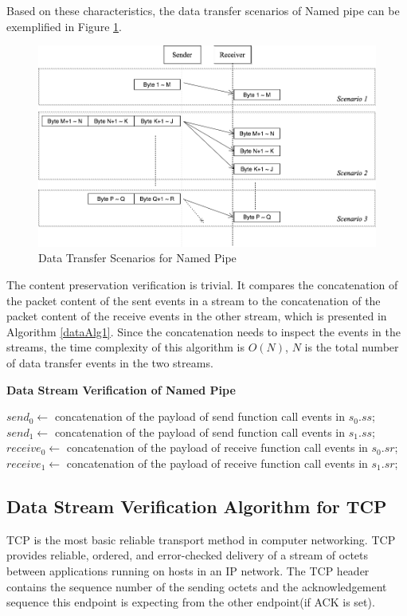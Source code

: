 Based on these characteristics, the data transfer scenarios of Named pipe can be exemplified in Figure \ref{namedpipe}. 
\begin{figure}[H]
\centerline{\includegraphics[scale=0.4]{Figures/namedpipe}}
\caption{Data Transfer Scenarios for Named Pipe}
\label{namedpipe}
\end{figure}

The content preservation verification is trivial. It compares the concatenation of the packet content of the sent events in a stream to the concatenation of the packet content of the receive events in the other stream, which is presented in Algorithm \ref{dataAlg1}. Since the concatenation needs to inspect the events in the streams, the time complexity of this algorithm is $O(N)$, $N$ is the total number of data transfer events in the two streams.

\begin{algorithm}[H]
\DontPrintSemicolon
\caption{{\bf Data Stream Verification of Named Pipe} \label{dataAlg1}}
\;
$send_0 \leftarrow$ concatenation of the payload of send function call events in $s_0.ss$;\;
$send_1 \leftarrow$ concatenation of the payload of send function call events in $s_1.ss$;\;
$receive_0 \leftarrow$ concatenation of the payload of receive function call events in $s_0.sr$;\;
$receive_1 \leftarrow$ concatenation of the payload of receive function call events in $s_1.sr$;\;
\end{algorithm} 

\subsection{Data Stream Verification Algorithm for TCP}
TCP is the most basic reliable transport method in computer networking. TCP provides reliable, ordered, and error-checked delivery of a stream of octets between applications running on hosts in an IP network. The TCP header contains the sequence number of the sending octets and the acknowledgement sequence this endpoint is expecting from the other endpoint(if ACK is set). 

